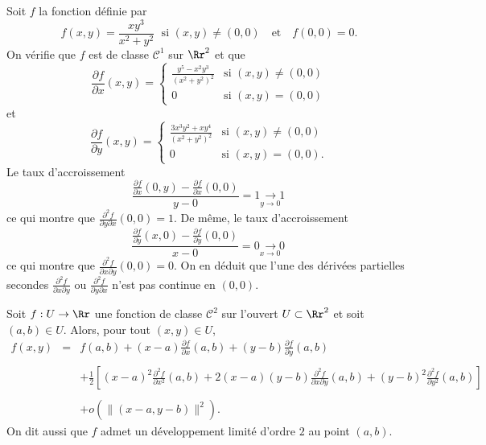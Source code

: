 \documentclass[class=report,crop=false]{standalone}
\begin{document}
Soit $f$ la fonction définie par
$$f(x,y)=\frac{xy^3}{x^2+y^2}\;\mbox{ si }(x,y)\neq (0,0)\quad \mbox{et}\quad f(0,0)= 0.$$
On vérifie que $f$ est de classe $\mathscr{C}^1$ sur $\Rr^2$ et que
$$\frac{\partial f}{\partial x}(x,y)=\left\{\begin{array}{cl}\displaystyle \frac{y^5-x^2y^3}{(x^2+y^2)^2}&\mbox{si }(x,y)\neq (0,0)\\ 0&\mbox{si }(x,y)=(0,0)
\end{array}\right.$$
et 
$$\frac{\partial f}{\partial y}(x,y)=\left\{\begin{array}{cl}\displaystyle \frac{3x^3y^2+xy^4}{(x^2+y^2)^2}&\mbox{si }(x,y)\neq (0,0)\\ 0&\mbox{si }(x,y)=(0,0).\end{array}\right.$$
Le taux d'accroissement
$$\frac{\frac{\partial f}{\partial x}(0,y)-\frac{\partial f}{\partial x}(0,0)}{y-0}=1\underset{y\to 0\; \; \; }{\longrightarrow 1}$$
ce qui montre que $\displaystyle \frac{\partial ^2f}{\partial y\partial x}(0,0)=1$.
De m\^eme, le taux d'accroissement
$$\frac{\frac{\partial f}{\partial y}(x,0)-\frac{\partial f}{\partial y}(0,0)}{x-0}=0\underset{x\to 0\; \; \; }{\longrightarrow 0}$$
ce qui montre que $\displaystyle \frac{\partial ^2f}{\partial x\partial y}(0,0)=0$. On en déduit que l'une des dérivées partielles secondes $\displaystyle \frac{\partial ^2f}{\partial x\partial y}$ ou $\displaystyle \frac{\partial ^2f}{\partial y\partial x}$ n'est pas continue en $(0,0)$.

\vskip6mm

\begin{theoreme}Soit $f:U\to \Rr$ une fonction de classe ${\mathscr C}^2$ sur l'ouvert $U\subset \Rr^2$ et soit $(a,b)\in U$. Alors, pour tout $(x,y)\in U$,
$$\begin{array}{ccl}f(x,y)&=&\displaystyle f(a,b)+(x-a)\frac{\partial f}{\partial x}(a,b)+(y-b)\frac{\partial f}{\partial y}(a,b)\\ \\ & &\displaystyle +\frac{1}{2}\left[(x-a)^2\frac{\partial ^2f}{\partial x^2}(a,b)+2(x-a)(y-b)\frac{\partial ^2f}{\partial x\partial y}(a,b)+(y-b)^2\frac{\partial ^2f}{\partial y^2}(a,b)\right]\\ \\ & &\displaystyle +o\left(\|(x-a,y-b)\|^2\right).\end{array}$$
On dit aussi que $f$ admet un développement limité d'ordre $2$ au point $(a,b)$.
\end{theoreme}
\end{document}
